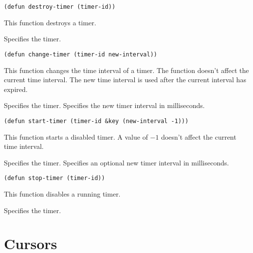 \begin{lispd}
\syntax\begin{verbatim}
(defun destroy-timer (timer-id))
\end{verbatim}
\beschr This function destroys a timer.
\parameter
\begin{paramd}
 Specifies the timer.
\end{paramd}
\end{lispd}

\begin{lispd}
\syntax\begin{verbatim}
(defun change-timer (timer-id new-interval))
\end{verbatim}
\beschr This function changes the time interval of a timer. The function doesn't
affect the current time interval. The new time interval is used after the
current interval has expired.
\parameter
\begin{paramd}
 Specifies the timer.
 Specifies the new timer interval in milliseconds.
\end{paramd}
\end{lispd}

\begin{lispd}
\syntax\begin{verbatim}
(defun start-timer (timer-id &key (new-interval -1)))
\end{verbatim}
\beschr This function starts a disabled timer. A value of $-1$ doesn't affect 
the current time interval.
\parameter
\begin{paramd}
 Specifies the timer.
 Specifies an optional new timer interval in milliseconds.
\end{paramd}
\end{lispd}

\begin{lispd}
\syntax\begin{verbatim}
(defun stop-timer (timer-id))
\end{verbatim}
\beschr This function disables a running timer.
\parameter
\begin{paramd}
 Specifies the timer.
\end{paramd}
\end{lispd}

\chapter{Cursors}

